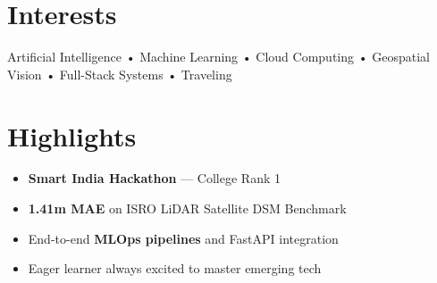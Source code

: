 \documentclass[10pt,a4paper]{article}
\newenvironment{rightcolumn}{\begin{minipage}[t]{0.34\textwidth}}{\end{minipage}}
\begin{document}
\begin{rightcolumn}
\section*{Interests}
Artificial Intelligence • Machine Learning • Cloud Computing • Geospatial Vision • Full-Stack Systems • Traveling

\section*{Highlights}
\begin{itemize}[leftmargin=12pt, itemsep=0pt]
    \item \textbf{Smart India Hackathon} — College Rank 1
    \item \textbf{1.41m MAE} on ISRO LiDAR Satellite DSM Benchmark
    \item End-to-end \textbf{MLOps pipelines} and FastAPI integration
    \item Eager learner always excited to master emerging tech
\end{itemize}

\end{rightcolumn}
\end{document}
